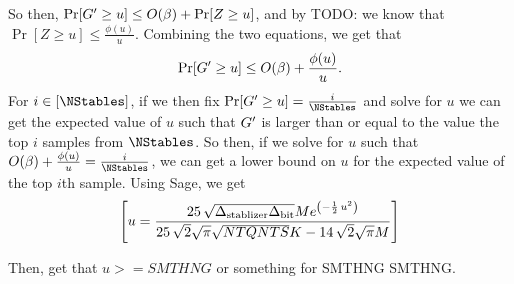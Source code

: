So then, 
$
	\Pr[G' \geq u] \leq O(\beta) + \Pr[Z \geq u]
$,
and by TODO: we know that $\Pr[Z \geq u] \leq \frac{\phi(u)}{u}$. Combining the two equations,
we get that 
$$
	\Pr[G' \geq u] \leq O(\beta) + \frac{\phi(u)}{u}.
$$
For $i \in [\NStables]$, if we then fix $\Pr[\genscoreRVCorrected \geq u] = \frac{i}{\NStables}$
and solve for $u$ we can get the expected value of $u$ such that $G'$ is larger than
or equal to the value the top $i$ samples from $\NStables$.
So then, if we solve for $u$ such that $O(\beta) + \frac{\phi(u)}{u} = \frac{i}{\NStables}$,
we can get a lower bound on $u$ for the expected value of the top $i$th sample.
Using Sage, we get 
$$
\left[u = \frac{25 \, \sqrt{{{\Delta_{\text{stablizer}}}} {{\Delta_{\text{bit}}}}} M e^{\left(-\frac{1}{2} \, u^{2}\right)}}{25 \, \sqrt{2} \sqrt{\pi} \sqrt{{NTQ} {NTS}} K - 14 \, \sqrt{2} \sqrt{\pi} M}\right]
$$

Then, get that $u >= SMTHNG $ or something for SMTHNG SMTHNG.






